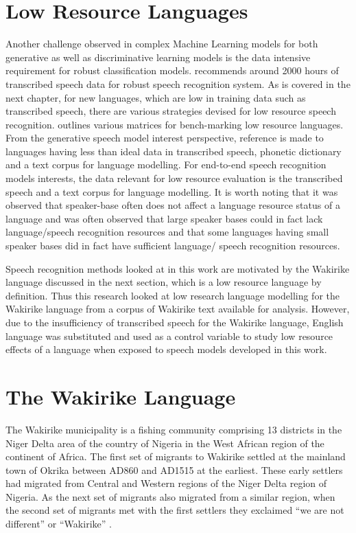 \section{Low Resource Languages}
Another challenge observed in complex Machine Learning models for both generative as well as discriminative learning models is the data intensive requirement for robust classification models. \cite{saon2015ibm} recommends around 2000 hours of transcribed speech data for robust speech recognition system. As is covered in the next chapter, for new languages, which are low in training data such as transcribed speech, there are various strategies devised for low resource speech recognition. \cite{besacier2014automatic} outlines various matrices for bench-marking low resource languages.  From the generative speech model interest perspective,  reference is made to languages having less than ideal data in transcribed speech, phonetic dictionary and a text corpus for language modelling.  For end-to-end speech recognition models interests, the data relevant for low resource evaluation is the transcribed speech and a text corpus for language modelling.  It is worth noting that it was observed \citep{besacier2014automatic} that speaker-base often does not affect a language resource status of a language and was often observed that large speaker bases could in fact lack language/speech recognition resources and that some languages having small speaker bases did in fact have sufficient language/ speech recognition resources.

Speech recognition methods looked at in this work are motivated by the Wakirike language discussed in the next section, which is a low resource language by definition.  Thus this research looked at low research language modelling for the Wakirike language from a corpus of Wakirike text available for analysis.  However, due to the insufficiency of transcribed speech for the Wakirike language, English language was substituted and used as a control variable to study low resource effects of a language when exposed to speech models developed in this work.

\section{The Wakirike Language}
The Wakirike municipality is a fishing community comprising 13 districts in the Niger Delta area of the country of Nigeria in the West African region of the continent of Africa. The first set of migrants to Wakirike settled at the mainland town of Okrika between AD860 and AD1515 at the earliest.  These early settlers had migrated from Central and Western regions of the Niger Delta region of Nigeria.  As the next set of migrants also migrated from a similar region, when the second set of migrants met with the first settlers they exclaimed “we are not different” or “Wakirike” \citep{wakirike}.  

